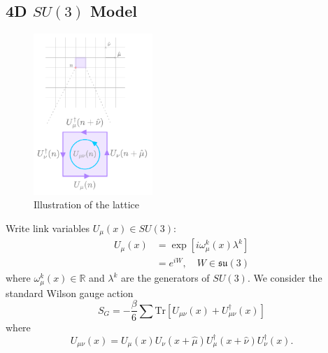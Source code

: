 \documentclass[a4paper,11pt]{article}
\begin{document}
\subsection{\label{subsec:4dSU3}4D \texorpdfstring{$SU(3)$}{SU(3)} Model}
%
\begin{figure}
  \begin{center}
    \caption{Illustration of the lattice}
    \includegraphics[width=0.4\textwidth]{assets/lattice}
  \end{center}
  \label{fig:lattice}
\end{figure}
%
Write link variables $U_{\mu}(x) \in SU(3)$:
%
\begin{align}
U_{\mu}(x) &= \exp\left[i \omega_{\mu}^{k}(x) \lambda^{k} \right] \\
&= e^{iW}, \quad W \in \mathfrak{su}(3)
\end{align}
%
where $\omega_{\mu}^{k}(x) \in \mathbb{R}$ and $\lambda^{k}$ are the generators of $SU(3)$.
%
We consider the standard Wilson gauge action
%
\begin{equation}
S_{G} = -\frac{\beta}{6}\sum \mathrm{Tr}\left[U_{\mu\nu}(x) + U^{\dagger}_{\mu\nu}(x) \right]
\end{equation}
%
where 
\begin{equation*}
    U_{\mu\nu}(x) = U_{\mu}(x) U_{\nu}(x + \hat{\mu}) U_{\mu}^{\dagger}(x + \hat{\nu}) U^{\dagger}_{\nu}(x).
\end{equation*}

%
\end{document}
